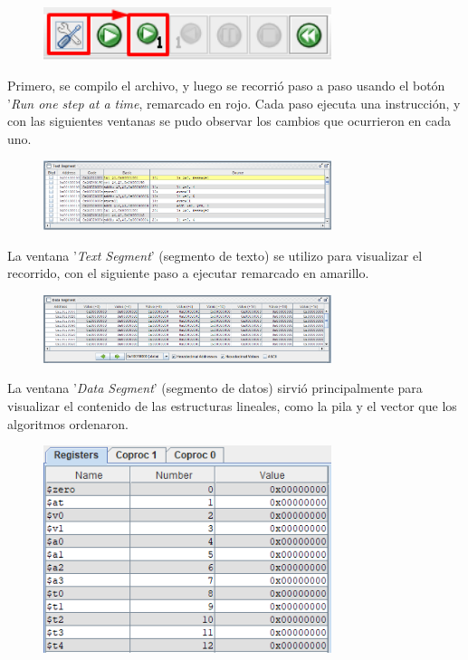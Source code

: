 \documentclass[titlepage]{article}
\begin{document}
\begin{figure}[ht]
    \centering
    \includegraphics[width=0.75\textwidth]{images/step1.png} %
    \label{fig:step1}
\end{figure}

Primero, se compilo el archivo, y luego se recorrió paso a paso usando el botón '\emph{Run one step at a time}, remarcado en rojo. Cada paso ejecuta una instrucción, y con las siguientes ventanas se pudo observar los cambios que ocurrieron en cada uno.

\begin{figure}[ht]
    \centering
    \includegraphics[width=0.75\textwidth]{images/step2.png} %
    \label{fig:step2}
\end{figure}

La ventana '\emph{Text Segment}' (segmento de texto) se utilizo para visualizar el recorrido, con el siguiente paso a ejecutar remarcado en amarillo.

\begin{figure}[ht]
    \centering
    \includegraphics[width=0.75\textwidth]{images/step3.png} %
    \label{fig:step3}
\end{figure}

La ventana '\emph{Data Segment}' (segmento de datos) sirvió principalmente para visualizar el contenido de las estructuras lineales, como la pila y el vector que los algoritmos ordenaron.

\begin{figure}[ht]
    \centering
    \includegraphics[width=0.75\textwidth]{images/step4.png} %
    \label{fig:step4}
\end{figure}
\end{document}
